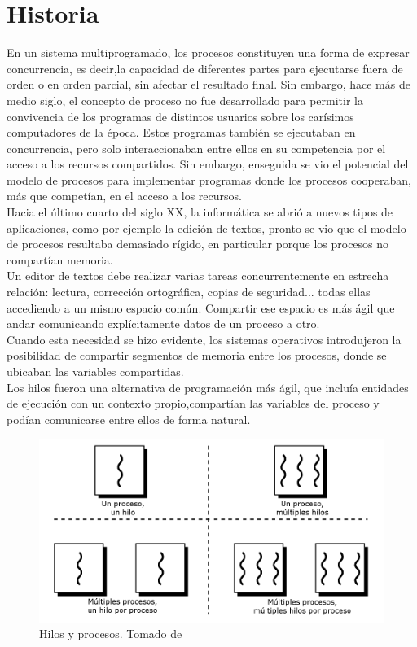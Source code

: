\documentclass{report}   %
\begin{document}
\section*{Historia}
En un sistema multiprogramado, los procesos constituyen una forma de expresar concurrencia, es decir,la capacidad de diferentes partes para ejecutarse fuera de orden o en orden parcial, sin afectar el resultado final. Sin embargo, hace más de medio siglo, el concepto de proceso no fue desarrollado para permitir la convivencia de los programas de distintos usuarios sobre los carísimos computadores de la época. Estos programas también se ejecutaban en concurrencia, pero solo interaccionaban entre ellos en su competencia por el acceso a los recursos compartidos. Sin embargo, enseguida se vio el potencial del modelo de procesos para implementar programas donde los procesos cooperaban, más que competían, en el acceso a los recursos.\\

Hacia el último cuarto del siglo XX, la informática se abrió a nuevos tipos de aplicaciones, como por ejemplo la edición de textos, pronto se vio que el modelo de procesos resultaba demasiado rígido, en particular porque los procesos no compartían memoria.\\
 Un editor de textos debe realizar varias tareas concurrentemente en estrecha relación: lectura, corrección ortográfica, copias de seguridad... 
todas ellas accediendo a un mismo espacio común. Compartir ese espacio es más ágil que andar comunicando explícitamente datos de un proceso a otro. \\ Cuando esta necesidad se hizo evidente, los sistemas operativos introdujeron la posibilidad de compartir segmentos de memoria entre los procesos, donde se ubicaban las variables compartidas. \\

Los hilos fueron una alternativa de programación más ágil, que incluía entidades de ejecución con un contexto propio,compartían las variables del proceso y podían comunicarse entre ellos de forma natural.\\
\begin{figure}[H]
      \centering
      \captionsetup{justification=centering}
      \includegraphics[scale=0.5]{Hilos.png}
      \caption{Hilos y procesos. Tomado de \cite{2}}
      \label{fig:Hilos}
   \end{figure}
\end{document}
